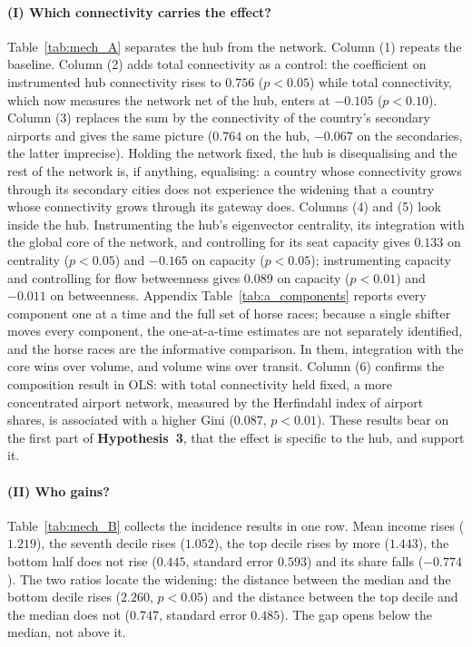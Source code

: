 \paragraph{(I) Which connectivity carries the effect?}
Table~\ref{tab:mech_A} separates the hub from the network. Column (1) repeats the baseline. Column (2) adds total connectivity as a control: the coefficient on instrumented hub connectivity rises to $0.756$ ($p<0.05$) while total connectivity, which now measures the network net of the hub, enters at $-0.105$ ($p<0.10$). Column (3) replaces the sum by the connectivity of the country's secondary airports and gives the same picture ($0.764$ on the hub, $-0.067$ on the secondaries, the latter imprecise). Holding the network fixed, the hub is disequalising and the rest of the network is, if anything, equalising: a country whose connectivity grows through its secondary cities does not experience the widening that a country whose connectivity grows through its gateway does. Columns (4) and (5) look inside the hub. Instrumenting the hub's eigenvector centrality, its integration with the global core of the network, and controlling for its seat capacity gives $0.133$ on centrality ($p<0.05$) and $-0.165$ on capacity ($p<0.05$); instrumenting capacity and controlling for flow betweenness gives $0.089$ on capacity ($p<0.01$) and $-0.011$ on betweenness. Appendix Table~\ref{tab:a_components} reports every component one at a time and the full set of horse races; because a single shifter moves every component, the one-at-a-time estimates are not separately identified, and the horse races are the informative comparison. In them, integration with the core wins over volume, and volume wins over transit. Column (6) confirms the composition result in OLS: with total connectivity held fixed, a more concentrated airport network, measured by the Herfindahl index of airport shares, is associated with a higher Gini ($0.087$, $p<0.01$). These results bear on the first part of \textbf{Hypothesis~3}, that the effect is specific to the hub, and support it.



\paragraph{(II) Who gains?}
Table~\ref{tab:mech_B} collects the incidence results in one row. Mean income rises ($1.219$), the seventh decile rises ($1.052$), the top decile rises by more ($1.443$), the bottom half does not rise ($0.445$, standard error $0.593$) and its share falls ($-0.774$). The two ratios locate the widening: the distance between the median and the bottom decile rises ($2.260$, $p<0.05$) and the distance between the top decile and the median does not ($0.747$, standard error $0.485$). The gap opens below the median, not above it.

